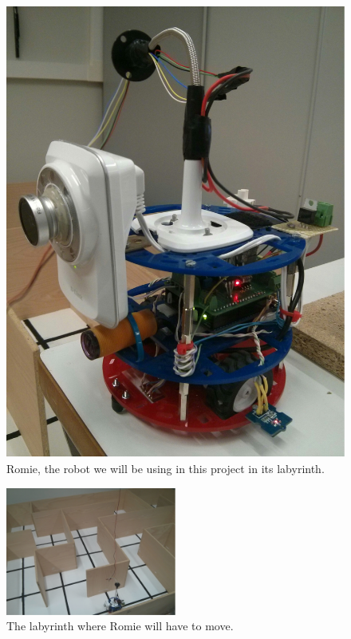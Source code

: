 \begin{figure}[!htbp]
	\centering
	\includegraphics[height=0.3\textheight]{fig/romie}
	\caption{Romie, the robot we will be using in this project in its labyrinth.}\label{fig:romie}
\end{figure}

\begin{figure}[!htbp]
	\centering
	\includegraphics[width=0.5\textwidth]{fig/labyrinth}
	\caption{The labyrinth where Romie will have to move.}\label{fig:labyrinth}
\end{figure}


